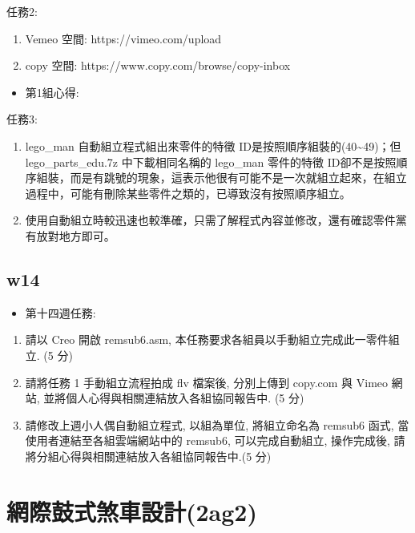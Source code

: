 \documentclass[]{article}
\begin{document}
任務2:

\begin{enumerate}
\def\labelenumi{\arabic{enumi}.}
\item
  Vemeo 空間: https://vimeo.com/upload
\item
  copy 空間: https://www.copy.com/browse/copy-inbox
\end{enumerate}

\begin{itemize}
\itemsep1pt\parskip0pt
\item
  第1組心得:
\end{itemize}

任務3:

\begin{enumerate}
\def\labelenumi{\arabic{enumi}.}
\item
  lego\_man 自動組立程式組出來零件的特徵
  ID是按照順序組裝的(40\textasciitilde{}49)；但lego\_parts\_edu.7z
  中下載相同名稱的 lego\_man 零件的特徵
  ID卻不是按照順序組裝，而是有跳號的現象，這表示他很有可能不是一次就組立起來，在組立過程中，可能有刪除某些零件之類的，已導致沒有按照順序組立。
\item
  使用自動組立時較迅速也較準確，只需了解程式內容並修改，還有確認零件黨有放對地方即可。
\end{enumerate}

\subsection{w14}\label{w14}

\begin{itemize}
\itemsep1pt\parskip0pt
\item
  第十四週任務:
\end{itemize}

\begin{enumerate}
\def\labelenumi{\arabic{enumi}.}
\item
  請以 Creo 開啟 remsub6.asm,
  本任務要求各組員以手動組立完成此一零件組立. (5 分)
\item
  請將任務 1 手動組立流程拍成 flv 檔案後, 分別上傳到 copy.com 與 Vimeo
  網站, 並將個人心得與相關連結放入各組協同報告中. (5 分)
\item
  請修改上週小人偶自動組立程式, 以組為單位, 將組立命名為 remsub6 函式,
  當使用者連結至各組雲端網站中的 remsub6, 可以完成自動組立, 操作完成後,
  請將分組心得與相關連結放入各組協同報告中.(5 分)
\end{enumerate}

\section{網際鼓式煞車設計(2ag2)}\label{ux7db2ux969bux9f13ux5f0fux715eux8ecaux8a2dux8a082ag2}
\end{document}
